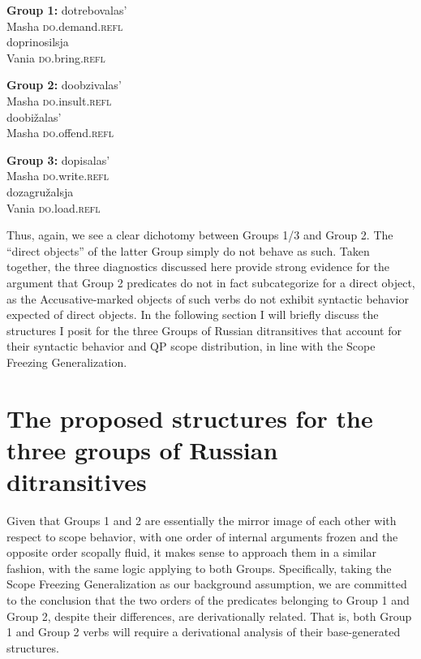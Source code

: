\documentclass[output=paper,colorlinks,citecolor=brown]{./langscibook}
\begin{document}
\ea%
    \label{ex:antonyuk:44}
    \textbf{Group 1:}
    \ea \label{ex:antonyuk:44a}
       {dotrebovalas’}\\
    {} Masha   \textsc{do}.demand.\textsc{refl}\\
    \ex \label{ex:antonyuk:44b}
       {doprinosilsja}\\
    Vania   \textsc{do}.bring.\textsc{refl}\\
    \z
\z

\ea%
    \label{ex:antonyuk:45}
    \textbf{Group 2:}
    \ea \label{ex:antonyuk:45a}
       {doobzivalas’}\\
    Masha \textsc{do}.insult.\textsc{refl}\\
    \ex \label{ex:antonyuk:45b}
      {doobižalas’}\\
    Masha \textsc{do}.offend.\textsc{refl}\\
    \z
\z

\ea%
    \label{ex:antonyuk:46}
    \textbf{Group 3:}
    \ea \label{ex:antonyuk:46a}
     {dopisalas’}\\
    Masha \textsc{do}.write.\textsc{refl}\\
    \ex \label{ex:antonyuk:46b}
     {dozagružalsja}\\
    Vania \textsc{do}.load.\textsc{refl}\\
    \z
\z

Thus, again, we see a clear dichotomy between Groups 1/3 and Group 2. The “direct objects” of the latter Group simply do not behave as such. Taken together, the three diagnostics discussed here provide strong evidence for the argument that Group 2 predicates do not in fact subcategorize for a direct object, as the Accusative-marked objects of such verbs do not exhibit syntactic behavior expected of direct objects. In the following section I will briefly discuss the structures I posit for the three Groups of Russian ditransitives that account for their syntactic behavior and QP scope distribution, in line with the Scope Freezing Generalization.

\section{The proposed structures for the three groups of Russian ditransitives}\label{sec:antonyuk:4}

Given that Groups 1 and 2 are essentially the mirror image of each other with respect to scope behavior, with one order of internal arguments frozen and the opposite order scopally fluid, it makes sense to approach them in a similar fashion, with the same logic applying to both Groups. Specifically, taking the Scope Freezing Generalization as our background assumption, we are committed to the conclusion that the two orders of the predicates belonging to Group 1 and Group 2, despite their differences, are derivationally related. That is, both Group 1 and Group 2 verbs will require a derivational analysis of their base-generated structures.
\end{document}
